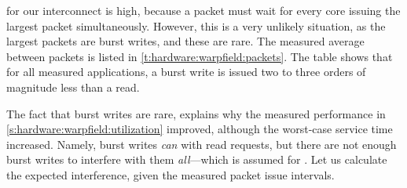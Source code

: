 \SYMlatencyWC for our interconnect is high, because a packet must wait for every core issuing the largest packet simultaneously.
However, this is a very unlikely situation, as the largest packets are burst writes, and these are rare.
The measured average  \SYMpacketinterval* between packets is listed in \vref{t:hardware:warpfield:packets}.
The table shows that for all measured applications, a burst write is issued two to three orders of magnitude less than a read.




The fact that burst writes are rare, explains why the measured performance in \cref{s:hardware:warpfield:utilization} improved, although the worst-case service time increased.
Namely, burst writes \emph{can}  with read requests, but there are not enough burst writes to interfere with them \emph{all}---which is assumed for \SYMlatencyWC.
Let us calculate the expected interference, given the measured packet issue intervals.

